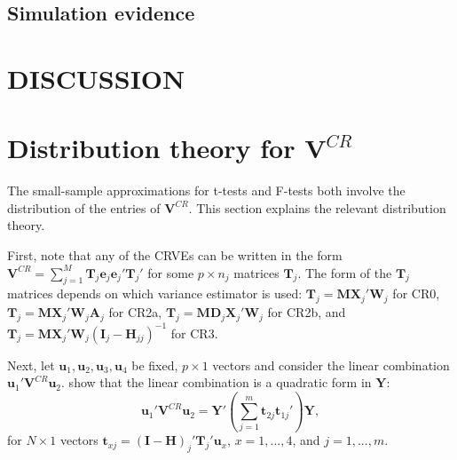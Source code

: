 \documentclass[12pt]{article}\usepackage[]{graphicx}\usepackage[]{color}
\newcommand{\bm}{\mathbf}
\begin{document}
\subsection{Simulation evidence}
\label{subsec:simulation_F}

\section{DISCUSSION}
\label{sec:discussion}

\appendix
\section{Distribution theory for $\bm{V}^{CR}$}
\label{app:VCR_dist}

The small-sample approximations for t-tests and F-tests both involve the distribution of the entries of $\bm{V}^{CR}$. This section explains the relevant distribution theory.

First, note that any of the CRVEs can be written in the form $\bm{V}^{CR} = \sum_{j=1}^M \bm{T}_j \bm{e}_j \bm{e}_j' \bm{T}_j'$ for some $p \times n_j$ matrices $\bm{T}_j$. 
The form of the $\bm{T}_j$ matrices depends on which variance estimator is used: $\bm{T}_j = \bm{M}\bm{X}_j' \bm{W}_j$ for CR0, $\bm{T}_j = \bm{M} \bm{X}_j' \bm{W}_j \bm{A}_j$ for CR2a, $\bm{T}_j = \bm{M} \bm{D}_j \bm{X}_j' \bm{W}_j$ for CR2b, and $\bm{T}_j = \bm{M} \bm{X}_j' \bm{W}_j \left(\bm{I}_j - \bm{H}_{jj}\right)^{-1}$ for CR3.

Next, let $\bm{u}_1,\bm{u}_2,\bm{u}_3,\bm{u}_4$ be fixed, $p \times 1$ vectors and consider the linear combination $\bm{u}_1' \bm{V}^{CR} \bm{u}_2$. 
\citet[Theorem 4]{Bell2002bias} show that the linear combination is a quadratic form in $\bm{Y}$: \[
\bm{u}_1' \bm{V}^{CR} \bm{u}_2 = \bm{Y}'\left(\sum_{j=1}^m \bm{t}_{2j} \bm{t}_{1j}'\right) \bm{Y}, \]
for $N \times 1$ vectors $\bm{t}_{xj} = \left(\bm{I} - \bm{H}\right)_j' \bm{T}_j' \bm{u}_x$, $x = 1,...,4$, and $j = 1,...,m$. 
\end{document}
